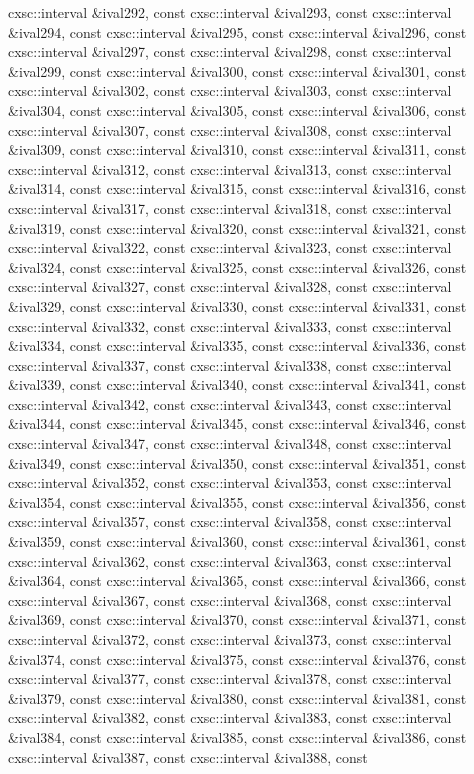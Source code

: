 \begin{DoxyCompactItemize}
cxsc\-::interval \&ival292, const cxsc\-::interval \&ival293, const cxsc\-::interval \&ival294, const cxsc\-::interval \&ival295, const cxsc\-::interval \&ival296, const cxsc\-::interval \&ival297, const cxsc\-::interval \&ival298, const cxsc\-::interval \&ival299, const cxsc\-::interval \&ival300, const cxsc\-::interval \&ival301, const cxsc\-::interval \&ival302, const cxsc\-::interval \&ival303, const cxsc\-::interval \&ival304, const cxsc\-::interval \&ival305, const cxsc\-::interval \&ival306, const cxsc\-::interval \&ival307, const cxsc\-::interval \&ival308, const cxsc\-::interval \&ival309, const cxsc\-::interval \&ival310, const cxsc\-::interval \&ival311, const cxsc\-::interval \&ival312, const cxsc\-::interval \&ival313, const cxsc\-::interval \&ival314, const cxsc\-::interval \&ival315, const cxsc\-::interval \&ival316, const cxsc\-::interval \&ival317, const cxsc\-::interval \&ival318, const cxsc\-::interval \&ival319, const cxsc\-::interval \&ival320, const cxsc\-::interval \&ival321, const cxsc\-::interval \&ival322, const cxsc\-::interval \&ival323, const cxsc\-::interval \&ival324, const cxsc\-::interval \&ival325, const cxsc\-::interval \&ival326, const cxsc\-::interval \&ival327, const cxsc\-::interval \&ival328, const cxsc\-::interval \&ival329, const cxsc\-::interval \&ival330, const cxsc\-::interval \&ival331, const cxsc\-::interval \&ival332, const cxsc\-::interval \&ival333, const cxsc\-::interval \&ival334, const cxsc\-::interval \&ival335, const cxsc\-::interval \&ival336, const cxsc\-::interval \&ival337, const cxsc\-::interval \&ival338, const cxsc\-::interval \&ival339, const cxsc\-::interval \&ival340, const cxsc\-::interval \&ival341, const cxsc\-::interval \&ival342, const cxsc\-::interval \&ival343, const cxsc\-::interval \&ival344, const cxsc\-::interval \&ival345, const cxsc\-::interval \&ival346, const cxsc\-::interval \&ival347, const cxsc\-::interval \&ival348, const cxsc\-::interval \&ival349, const cxsc\-::interval \&ival350, const cxsc\-::interval \&ival351, const cxsc\-::interval \&ival352, const cxsc\-::interval \&ival353, const cxsc\-::interval \&ival354, const cxsc\-::interval \&ival355, const cxsc\-::interval \&ival356, const cxsc\-::interval \&ival357, const cxsc\-::interval \&ival358, const cxsc\-::interval \&ival359, const cxsc\-::interval \&ival360, const cxsc\-::interval \&ival361, const cxsc\-::interval \&ival362, const cxsc\-::interval \&ival363, const cxsc\-::interval \&ival364, const cxsc\-::interval \&ival365, const cxsc\-::interval \&ival366, const cxsc\-::interval \&ival367, const cxsc\-::interval \&ival368, const cxsc\-::interval \&ival369, const cxsc\-::interval \&ival370, const cxsc\-::interval \&ival371, const cxsc\-::interval \&ival372, const cxsc\-::interval \&ival373, const cxsc\-::interval \&ival374, const cxsc\-::interval \&ival375, const cxsc\-::interval \&ival376, const cxsc\-::interval \&ival377, const cxsc\-::interval \&ival378, const cxsc\-::interval \&ival379, const cxsc\-::interval \&ival380, const cxsc\-::interval \&ival381, const cxsc\-::interval \&ival382, const cxsc\-::interval \&ival383, const cxsc\-::interval \&ival384, const cxsc\-::interval \&ival385, const cxsc\-::interval \&ival386, const cxsc\-::interval \&ival387, const cxsc\-::interval \&ival388, const 
\end{DoxyCompactItemize}

